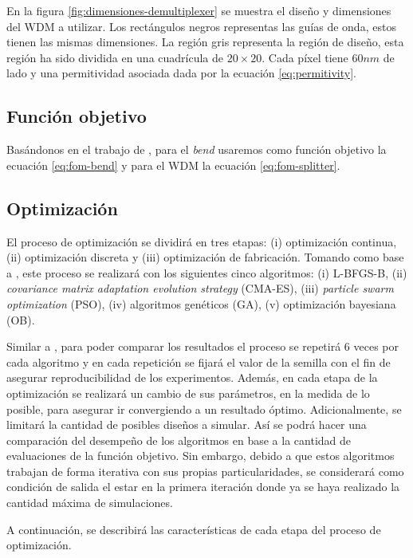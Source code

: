En la figura \ref{fig:dimensiones-demultiplexer} se muestra el diseño y dimensiones del WDM a utilizar.
Los rectángulos negros representas las guías de onda, estos tienen las mismas dimensiones.
La región gris representa la región de diseño, esta región ha sido dividida en una cuadrícula de $20 \times 20$.
Cada píxel tiene $60 nm$ de lado y una permitividad asociada dada por la ecuación \ref{eq:permitivity}.

\subsection{Función objetivo}

Basándonos en el trabajo de \cite{Su2020}, para el \emph{bend} usaremos como función objetivo la ecuación \ref{eq:fom-bend} y para el WDM la ecuación \ref{eq:fom-splitter}.

\subsection{Optimización}

El proceso de optimización se dividirá en tres etapas: (i) optimización continua, (ii) optimización discreta y (iii) optimización de fabricación.
Tomando como base a \cite{Elsawy2020, Schneider2019, Gregory2015}, este proceso se realizará con los siguientes cinco algoritmos: (i) L-BFGS-B, (ii) \emph{covariance matrix adaptation evolution strategy} (CMA-ES), (iii) \emph{particle swarm optimization} (PSO), (iv) algoritmos genéticos (GA), (v) optimización bayesiana (OB).

Similar a \cite{Schneider2019}, para poder comparar los resultados el proceso se repetirá 6 veces por cada algoritmo y en cada repetición se fijará el valor de la semilla con el fin de asegurar reproducibilidad de los experimentos.
Además, en cada etapa de la optimización se realizará un cambio de sus parámetros, en la medida de lo posible, para asegurar ir convergiendo a un resultado óptimo.
Adicionalmente, se limitará la cantidad de posibles diseños a simular.
Así se podrá hacer una comparación del desempeño de los algoritmos en base a la cantidad de evaluaciones de la función objetivo.
Sin embargo, debido a que estos algoritmos trabajan de forma iterativa con sus propias particularidades, se considerará como condición de salida el estar en la primera iteración donde ya se haya realizado la cantidad máxima de simulaciones.

A continuación, se describirá las características de cada etapa del proceso de optimización.

